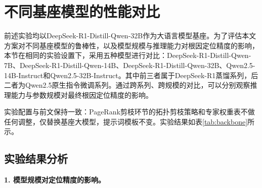 \section{不同基座模型的性能对比}

前述实验均以DeepSeek-R1-Distill-Qwen-32B作为大语言模型基座。为了评估本文方案对不同基座模型的鲁棒性，以及模型规模与推理能力对根因定位精度的影响，本节在相同的实验设置下，采用五种模型进行对比：DeepSeek-R1-Distill-Qwen-7B、DeepSeek-R1-Distill-Qwen-14B、DeepSeek-R1-Distill-Qwen-32B、Qwen2.5-14B-Instruct和Qwen2.5-32B-Instruct。其中前三者属于DeepSeek-R1蒸馏系列，后二者为Qwen2.5原生指令微调系列。通过跨系列、跨规模的对比，可以分别观察推理能力与参数规模对最终根因定位精度的影响。

实验配置与前文保持一致：PageRank剪枝环节的拓扑剪枝策略和专家权重表不做任何调整，仅替换基座大模型，提示词模板不变。实验结果如表\ref{tab:backbone}所示。


\begin{table}[htbp]
    \centering
    \caption{不同基座模型下的根因定位准确率对比}
    \label{tab:backbone}
    \end{table}
\subsection{实验结果分析}

\textbf{1. 模型规模对定位精度的影响。}

